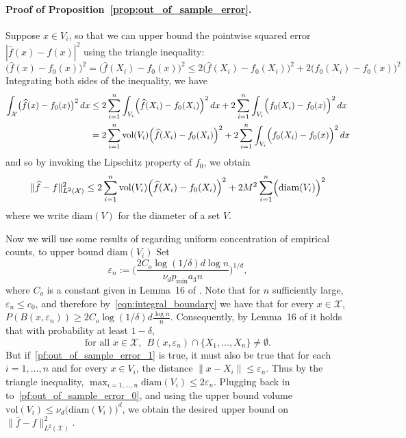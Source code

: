 \documentclass[twoside]{article}
\newcommand{\diam}{\mathrm{diam}}
\newcommand{\vol}{\text{vol}}
\newcommand{\1}{\mathbf{1}}
\newcommand{\Xset}{\mathcal{X}}
\newcommand{\Leb}{L}
\newcommand{\mc}[1]{\mathcal{#1}}
\newcommand{\dx}{\,dx}
\newcommand{\wh}[1]{\widehat{#1}}
\theoremstyle{definition}
\theoremstyle{remark}
\begin{document}
\paragraph{Proof of Proposition~\ref{prop:out_of_sample_error}.}
Suppose $x \in V_i$, so that we can upper bound the pointwise squared error $|\wh{f}(x) - f(x)|^2$ using the triangle inequality:
\begin{equation*}
\bigl(\wh{f}(x) - f_0(x)\bigr)^2 = \bigl(\wh{f}(X_i) - f_0(x)\bigr)^2 \leq 2\bigl(\wh{f}(X_i) - f_0(X_i)\bigr)^2 + 2\bigl(f_0(X_i) - f_0(x)\bigr)^2
\end{equation*}
Integrating both sides of the inequality, we have
\begin{align*}
\int_{\Xset} \bigl(\wh{f}(x) - f_0(x)\bigr)^2 \,dx & \leq 2  \sum_{i = 1}^{n} \int_{V_i} \Bigl(\wh{f}(X_i) - f_0(X_i)\Bigr)^2 \,dx + 2 \sum_{i = 1}^{n} \int_{V_i} \Bigl(f_0(X_i) - f_0(x)\Bigr)^2 \dx \\
& = 2 \sum_{i = 1}^{n} \vol(V_i) \Bigl(\wh{f}(X_i) - f_0(X_i)\Bigr)^2 + 2 \sum_{i = 1}^{n} \int_{V_i} \Bigl(f_0(X_i) - f_0(x)\Bigr)^2 \dx
\end{align*}
and so by invoking the Lipschitz property of $f_0$, we obtain
\begin{equation}
\label{pf:out_of_sample_error_0}
\|\wh{f} - f\|_{\Leb^2(\Xset)}^2 \leq 2 \sum_{i = 1}^{n} \vol(V_i) \Bigl(\wh{f}(X_i) - f_0(X_i)\Bigr)^2 + 2 M^2 \sum_{i = 1}^{n} \Bigl(\mathrm{diam}(V_i)\Bigr)^2
\end{equation}
where we write $\mathrm{diam}(V)$ for the diameter of a set $V$. 

Now we will use some results of \citet{chaudhuri2010} regarding uniform concentration of empirical counts, to upper bound $\diam(V_i)$ Set
\begin{equation*}
\varepsilon_n := \biggl(\frac{2C_{o}\log(1/\delta)d\log n}{\nu_dp_{\min}a_3n}\biggr)^{1/d},
\end{equation*}
where $C_{o}$ is a constant given in Lemma~16 of \citet{chaudhuri2010}. Note that for $n$ sufficiently large, $\varepsilon_n \leq c_0$, and therefore by~\eqref{eqn:integral_boundary} we have that for every $x \in \Xset$, $P(B(x,\varepsilon_n)) \geq 2C_{o}\log(1/\delta)d\frac{\log n}{n}$. Consequently, by Lemma~16 of \citet{chaudhuri2010} it holds that with probability at least $1 - \delta$,
\begin{equation}
\label{pf:out_of_sample_error_1}
\textrm{for all $x \in \mc{X}$},~~ B(x,\varepsilon_n) \cap \{X_1,\ldots,X_n\} \neq \emptyset.
\end{equation}
But if~\eqref{pf:out_of_sample_error_1} is true, it must also be true that for each $i = 1,\ldots,n$ and for every $x \in V_i$, the distance $\|x - X_i\| \leq \varepsilon_n$. Thus by the triangle inequality, $\max_{i = 1,\ldots,n} \mathrm{diam}(V_i) \leq 2\varepsilon_n$. Plugging back in to~\eqref{pf:out_of_sample_error_0}, and using the upper bound volume $\vol(V_i) \leq \nu_d \bigl(\mathrm{diam}(V_i)\bigr)^d$, we obtain the desired upper bound on $\|\wh{f} - f\|_{\Leb^2(\Xset)}^2$.
\end{document}
